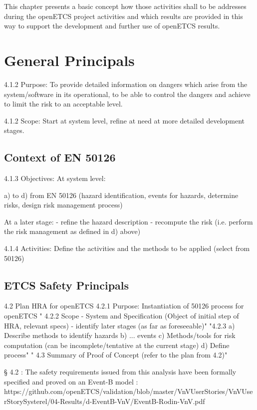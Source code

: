 \documentclass{template/openetcs_report}
\begin{document}
This chapter presents a basic concept how those activities shall to be addresses during the openETCS project activities and which results are provided in this way to support the development and further use of openETCS results.

\section{General Principals}

4.1.2 Purpose:
To provide detailed information on dangers which arise from the system/software in its operational, to be able to control the dangers and achieve to limit the risk to an acceptable level.

4.1.2 Scope:
Start at system level, refine at need at more detailed development stages.

\subsection{Context of EN 50126}

4.1.3 Objectives:
At system level:

a) to d) from EN 50126 (hazard identification, events for hazards, determine risks, design risk management process)  

At a later stage:
- refine the hazard description
- recompute the risk
(i.e. perform the risk management as defined in d) above)

4.1.4 Activities:
Define the activities and the methods to be applied (select from 50126)


\subsection{ETCS Safety Principals}

4.2 Plan HRA for openETCS
4.2.1 Purpose: Instantiation of 50126 process for openETCS
"
4.2.2 Scope
- System and Specification 
   (Object of initial step of HRA, relevant specs)
- identify later stages (as far as foreseeable)"
"4.2.3 
a) Describe methods to identify hazards
b) ... events
c) Methods/tools for risk computation (can be incomplete/tentative at the current stage)
d) Define process"
"
4.3 Summary of Proof of Concept
(refer to the plan from 4.2)"

§ 4.2 : The safety requirements issued from this analysis have been formally specified and proved on an Event-B model : https://github.com/openETCS/validation/blob/master/VnVUserStories/VnVUserStorySysterel/04-Results/d-EventB-VnV/EventB-Rodin-VnV.pdf
\end{document}

